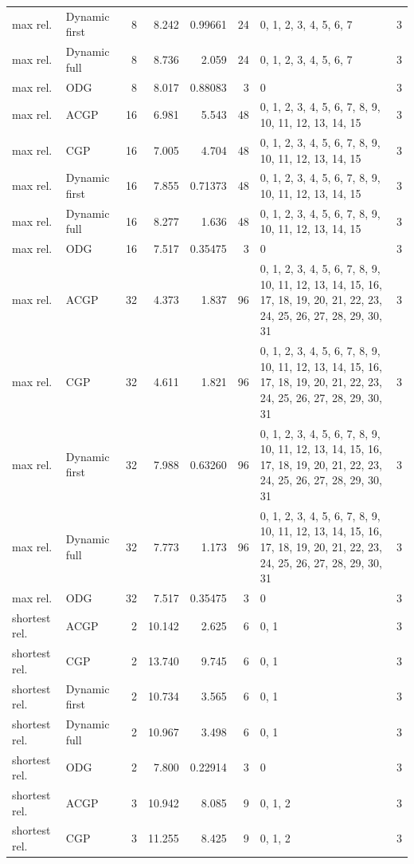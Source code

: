 \documentclass[10pt,a4paper]{article}
\begin{document}
\begin{longtable}{@{}p{23mm}p{29mm}rrrrp{36mm}r@{}}
max rel. & Dynamic first & 8 & 8.242 & 0.99661 & 24 & 0, 1, 2, 3, 4, 5, 6, 7 & 3 \\
max rel. & Dynamic full & 8 & 8.736 & 2.059 & 24 & 0, 1, 2, 3, 4, 5, 6, 7 & 3 \\
max rel. & ODG & 8 & 8.017 & 0.88083 & 3 & 0 & 3 \\
max rel. & ACGP & 16 & 6.981 & 5.543 & 48 & 0, 1, 2, 3, 4, 5, 6, 7, 8, 9, 10, 11, 12, 13, 14, 15 & 3 \\
max rel. & CGP & 16 & 7.005 & 4.704 & 48 & 0, 1, 2, 3, 4, 5, 6, 7, 8, 9, 10, 11, 12, 13, 14, 15 & 3 \\
max rel. & Dynamic first & 16 & 7.855 & 0.71373 & 48 & 0, 1, 2, 3, 4, 5, 6, 7, 8, 9, 10, 11, 12, 13, 14, 15 & 3 \\
max rel. & Dynamic full & 16 & 8.277 & 1.636 & 48 & 0, 1, 2, 3, 4, 5, 6, 7, 8, 9, 10, 11, 12, 13, 14, 15 & 3 \\
max rel. & ODG & 16 & 7.517 & 0.35475 & 3 & 0 & 3 \\
max rel. & ACGP & 32 & 4.373 & 1.837 & 96 & 0, 1, 2, 3, 4, 5, 6, 7, 8, 9, 10, 11, 12, 13, 14, 15, 16, 17, 18, 19, 20, 21, 22, 23, 24, 25, 26, 27, 28, 29, 30, 31 & 3 \\
max rel. & CGP & 32 & 4.611 & 1.821 & 96 & 0, 1, 2, 3, 4, 5, 6, 7, 8, 9, 10, 11, 12, 13, 14, 15, 16, 17, 18, 19, 20, 21, 22, 23, 24, 25, 26, 27, 28, 29, 30, 31 & 3 \\
max rel. & Dynamic first & 32 & 7.988 & 0.63260 & 96 & 0, 1, 2, 3, 4, 5, 6, 7, 8, 9, 10, 11, 12, 13, 14, 15, 16, 17, 18, 19, 20, 21, 22, 23, 24, 25, 26, 27, 28, 29, 30, 31 & 3 \\
max rel. & Dynamic full & 32 & 7.773 & 1.173 & 96 & 0, 1, 2, 3, 4, 5, 6, 7, 8, 9, 10, 11, 12, 13, 14, 15, 16, 17, 18, 19, 20, 21, 22, 23, 24, 25, 26, 27, 28, 29, 30, 31 & 3 \\
max rel. & ODG & 32 & 7.517 & 0.35475 & 3 & 0 & 3 \\
shortest rel. & ACGP & 2 & 10.142 & 2.625 & 6 & 0, 1 & 3 \\
shortest rel. & CGP & 2 & 13.740 & 9.745 & 6 & 0, 1 & 3 \\
shortest rel. & Dynamic first & 2 & 10.734 & 3.565 & 6 & 0, 1 & 3 \\
shortest rel. & Dynamic full & 2 & 10.967 & 3.498 & 6 & 0, 1 & 3 \\
shortest rel. & ODG & 2 & 7.800 & 0.22914 & 3 & 0 & 3 \\
shortest rel. & ACGP & 3 & 10.942 & 8.085 & 9 & 0, 1, 2 & 3 \\
shortest rel. & CGP & 3 & 11.255 & 8.425 & 9 & 0, 1, 2 & 3 \\

\end{longtable}
\end{document}
